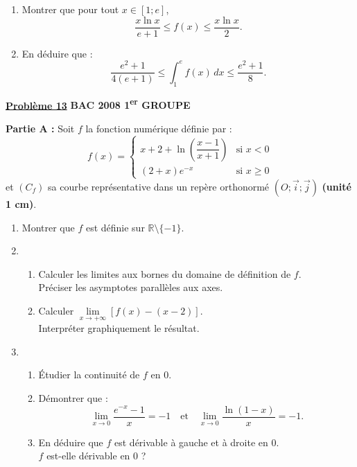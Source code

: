 \documentclass[12pt,a4paper]{article}
\newcommand{\exo}[1]{%
        \textbf{\underline{Problème #1}}
}
\begin{document}
\begin{multicols}{2}
\begin{enumerate}
    \item Montrer que pour tout \( x \in [1 ; e] \),
    \[
    \dfrac{x \ln x}{e + 1} \leq f(x) \leq \dfrac{x \ln x}{2}.
    \]

    \item En déduire que :
    \[
    \dfrac{e^2 + 1}{4(e + 1)} \leq \int_1^e f(x)\,dx \leq \dfrac{e^2 + 1}{8}.
    \]
\end{enumerate}

\exo{13} \textbf{BAC 2008 1\textsuperscript{er} GROUPE}

\textbf{Partie A :} Soit \( f \) la fonction numérique définie par :
\[
f(x) = 
\begin{cases}
x + 2 + \ln\left( \dfrac{x - 1}{x + 1} \right) & \text{si } x < 0 \\
(2 + x)e^{-x} & \text{si } x \geq 0
\end{cases}
\]
et \( (C_f) \) sa courbe représentative dans un repère orthonormé \( (O ; \vec{i} ; \vec{j}) \) \textbf{(unité 1 cm)}.

\begin{enumerate}
    \item Montrer que \( f \) est définie sur \( \mathbb{R} \setminus \{-1\} \).
    
    \item
    \begin{enumerate}
        \item Calculer les limites aux bornes du domaine de définition de \( f \).\\
        Préciser les asymptotes parallèles aux axes.

        \item Calculer \( \lim\limits_{x \to +\infty} \left[ f(x) - (x - 2) \right] \).\\
        Interpréter graphiquement le résultat.
    \end{enumerate}
    
    \item
    \begin{enumerate}
        \item Étudier la continuité de \( f \) en 0.

        \item Démontrer que : 
        \[
        \lim\limits_{x \to 0} \dfrac{e^{-x} - 1}{x} = -1
        \quad \text{et} \quad
        \lim\limits_{x \to 0} \dfrac{\ln(1 - x)}{x} = -1.
        \]

        \item En déduire que \( f \) est dérivable à gauche et à droite en 0.\\
        \( f \) est-elle dérivable en 0 ?
    \end{enumerate}


\end{enumerate}
\end{multicols}
\end{document}
